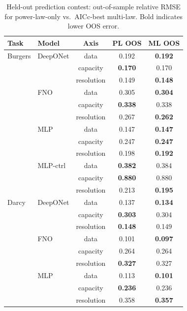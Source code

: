 \documentclass[11pt]{article}
\begin{document}
\begin{table}[h]
\centering
\caption{Held-out prediction contest: out-of-sample relative RMSE for
power-law-only vs.\ AICc-best multi-law. Bold indicates lower OOS
error.}
\label{tab:holdout}
\small
\begin{tabular}{@{}llccc@{}}
\toprule
\textbf{Task} & \textbf{Model} & \textbf{Axis} &
\textbf{PL OOS} & \textbf{ML OOS} \\
\midrule
Burgers & DeepONet   & data       & 0.192 & \textbf{0.192} \\
        &            & capacity   & \textbf{0.170} & 0.170 \\
        &            & resolution & 0.149 & \textbf{0.148} \\
        & FNO        & data       & 0.305 & \textbf{0.304} \\
        &            & capacity   & \textbf{0.338} & 0.338 \\
        &            & resolution & 0.267 & \textbf{0.262} \\
        & MLP        & data       & 0.147 & \textbf{0.147} \\
        &            & capacity   & 0.247 & \textbf{0.247} \\
        &            & resolution & 0.198 & \textbf{0.192} \\
        & MLP-ctrl   & data       & \textbf{0.382} & 0.384 \\
        &            & capacity   & \textbf{0.880} & 0.880 \\
        &            & resolution & 0.213 & \textbf{0.195} \\
\midrule
Darcy   & DeepONet   & data       & 0.137 & \textbf{0.134} \\
        &            & capacity   & \textbf{0.303} & 0.304 \\
        &            & resolution & \textbf{0.148} & 0.149 \\
        & FNO        & data       & 0.101 & \textbf{0.097} \\
        &            & capacity   & 0.264 & 0.264 \\
        &            & resolution & \textbf{0.327} & 0.327 \\
        & MLP        & data       & 0.113 & \textbf{0.101} \\
        &            & capacity   & \textbf{0.236} & 0.236 \\
        &            & resolution & 0.358 & \textbf{0.357} \\
\midrule

\end{tabular}
\end{table}
\end{document}

